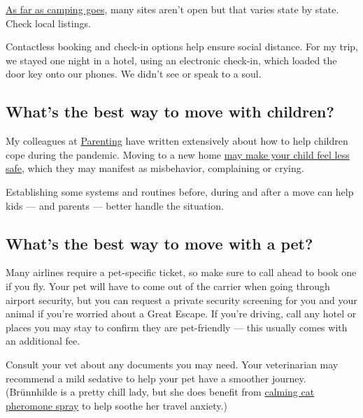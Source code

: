 \href{https://www.nytimes.com/2020/05/28/travel/camping-west-coast.html}{As
far as camping goes}, many sites aren't open but that varies state by
state. Check local listings.

Contactless booking and check-in options help ensure social distance.
For my trip, we stayed one night in a hotel, using an electronic
check-in, which loaded the door key onto our phones. We didn't see or
speak to a soul.

\hypertarget{whats-the-best-way-to-move-with-children}{%
\subsection{What's the best way to move with
children?}\label{whats-the-best-way-to-move-with-children}}

My colleagues at
\href{https://www.nytimes.com/section/parenting}{Parenting} have written
extensively about how to help children cope during the pandemic. Moving
to a new home
\href{https://www.nytimes.com/2020/07/13/parenting/moving-tips-kids.html}{may
make your child feel less safe}, which they may manifest as misbehavior,
complaining or crying.

Establishing some systems and routines before, during and after a move
can help kids --- and parents --- better handle the situation.

\hypertarget{whats-the-best-way-to-move-with-a-pet}{%
\subsection{What's the best way to move with a
pet?}\label{whats-the-best-way-to-move-with-a-pet}}

Many airlines require a pet-specific ticket, so make sure to call ahead
to book one if you fly. Your pet will have to come out of the carrier
when going through airport security, but you can request a private
security screening for you and your animal if you're worried about a
Great Escape. If you're driving, call any hotel or places you may stay
to confirm they are pet-friendly --- this usually comes with an
additional fee.

Consult your vet about any documents you may need. Your veterinarian may
recommend a mild sedative to help your pet have a smoother journey.
(Brünnhilde is a pretty chill lady, but she does benefit from
\href{https://www.feliway.com/us/Products/feliway-classic-spray}{calming
cat pheromone spray} to help soothe her travel anxiety.)

